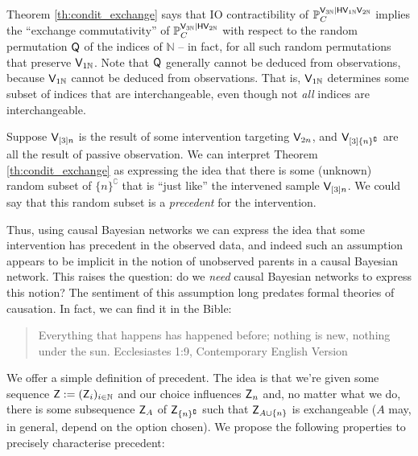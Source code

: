 Theorem \ref{th:condit_exchange} says that IO contractibility of $\mathbb{P}_C^{\mathsf{V}_{3\mathbb{N}}|\mathsf{H}\mathsf{V}_{1\mathbb{N}}\mathsf{V}_{2\mathbb{N}}}$ implies the ``exchange commutativity'' of $\mathbb{P}_C^{\mathsf{V}_{3\mathbb{N}}|\mathsf{H}\mathsf{V}_{2\mathbb{N}}}$ with respect to the random permutation $\mathsf{Q}$ of the indices of $\mathbb{N}$ -- in fact, for all such random permutations that preserve $\mathsf{V}_{1\mathbb{N}}$. Note that $\mathsf{Q}$ generally cannot be deduced from observations, because $\mathsf{V}_{1\mathbb{N}}$ cannot be deduced from observations. That is, $\mathsf{V}_{1\mathbb{N}}$ determines some subset of indices that are interchangeable, even though not \emph{all} indices are interchangeable. 

Suppose $\mathsf{V}_{[3]n}$ is the result of some intervention targeting $\mathsf{V}_{2n}$, and $\mathsf{V}_{[3]\{n\}^\complement}$ are all the result of passive observation. We can interpret Theorem \ref{th:condit_exchange} as expressing the idea that there is some (unknown) random subset of $\{n\}^\complement$ that is ``just like'' the intervened sample $\mathsf{V}_{[3]n}$. We could say that this random subset is a \emph{precedent} for the intervention.

Thus, using causal Bayesian networks we can express the idea that some intervention has precedent in the observed data, and indeed such an assumption appears to be implicit in the notion of unobserved parents in a causal Bayesian network. This raises the question: do we \emph{need} causal Bayesian networks to express this notion? The sentiment of this assumption long predates formal theories of causation. In fact, we can find it in the Bible:
\begin{quote}
Everything that happens has happened before; nothing is new, nothing under the sun. Ecclesiastes 1:9, Contemporary English Version
\end{quote}

We offer a simple definition of precedent. The idea is that we're given some sequence $\mathsf{Z}:=(\mathsf{Z}_i)_{i\in\mathbb{N}}$ and our choice influences $\mathsf{Z}_n$ and, no matter what we do, there is some subsequence $\mathsf{Z}_A$ of $\mathsf{Z}_{\{n\}^\complement}$ such that $\mathsf{Z}_{A\cup\{n\}}$ is exchangeable ($A$ may, in general, depend on the option chosen). We propose the following properties to precisely characterise precedent:

